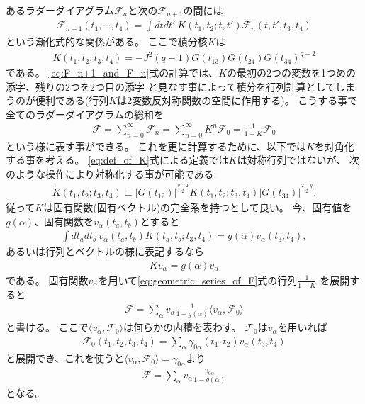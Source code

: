 あるラダーダイアグラム$\mathcal{F}_n$と次の$\mathcal{F}_{n+1}$の間には
\begin{align}
	\mathcal{F}_{n+1}(t_1, \cdots, t_4)
	= \int dtdt'\ K(t_1, t_2; t, t')\mathcal{F}_n(t, t', t_3, t_4)
	\label{eq:F_n+1_and_F_n}
\end{align}
という漸化式的な関係がある。
ここで積分核$K$は
\begin{align}
	K(t_1, t_2; t_3, t_4) = -J^2(q-1)G(t_{13})G(t_{24})G(t_{34})^{q-2}
	\label{eq:def_of_K}
\end{align}
である。
\eqref{eq:F_n+1_and_F_n}式の計算では、$K$の最初の2つの変数を1つめの添字、残りの2つを2つ目の添字
と見なす事によって積分を行列計算としてしまうのが便利である(行列$K$は2変数反対称関数の空間に作用する)。
こうする事で全てのラダーダイアグラムの総和を
\begin{align}
	\mathcal{F}
	= \sum_{n=0}^{\infty}\mathcal{F}_n
	= \sum_{n=0}^{\infty}K^n \mathcal{F}_0
	= \frac{1}{1 - K}\mathcal{F}_0
	\label{eq:geometric_series_of_F}
\end{align}
という様に表す事ができる。
これを更に計算するために、以下では$K$を対角化する事を考える。
\eqref{eq:def_of_K}式による定義では$K$は対称行列ではないが、
次のような操作により対称化する事が可能である:
\begin{align}
	\tilde{K}(t_1, t_2; t_3, t_4) \equiv
	|G(t_{12})|^{\frac{q-2}{2}}K(t_1, t_2; t_3, t_4)|G(t_{34})|^{\frac{2-q}{2}}.
\end{align}
従って$K$は固有関数(固有ベクトル)の完全系を持つとして良い。
今、固有値を$g(\alpha)$、固有関数を$v_{\alpha}(t_a, t_b)$とすると
\begin{align}
	\int dt_a dt_b\ v_{\alpha}(t_a, t_b)K(t_a, t_b; t_3, t_4)
	= g(\alpha)v_{\alpha}(t_3, t_4),
\end{align}
あるいは行列とベクトルの様に表記するなら
\begin{align}
	Kv_{\alpha} = g(\alpha)v_{\alpha}
\end{align}
である。
固有関数$v_{\alpha}$を用いて\eqref{eq:geometric_series_of_F}式の行列$\frac{1}{1-K}$
を展開すると
\begin{align}
	\mathcal{F}
	= \sum_{\alpha} v_{\alpha}\frac{1}{1 - g(\alpha)}\langle v_{\alpha}, \mathcal{F}_0\rangle
\end{align}
と書ける。
ここで$\langle v_{\alpha}, \mathcal{F}_0\rangle$は何らかの内積を表わす。
$\mathcal{F}_0$は$v_{\alpha}$を用いれば
\begin{align}
	\mathcal{F}_0(t_1, t_2, t_3, t_4)
	= \sum_{\alpha} \gamma_{0\alpha}(t_1, t_2)v_{\alpha}(t_3, t_4)
\end{align}
と展開でき、これを使うと$\langle v_{\alpha}, \mathcal{F}_0\rangle = \gamma_{0\alpha}$より
\begin{align}
	\mathcal{F}
	= \sum_{\alpha} v_{\alpha}\frac{\gamma_{0\alpha}}{1 - g(\alpha)}
\end{align}
となる。


